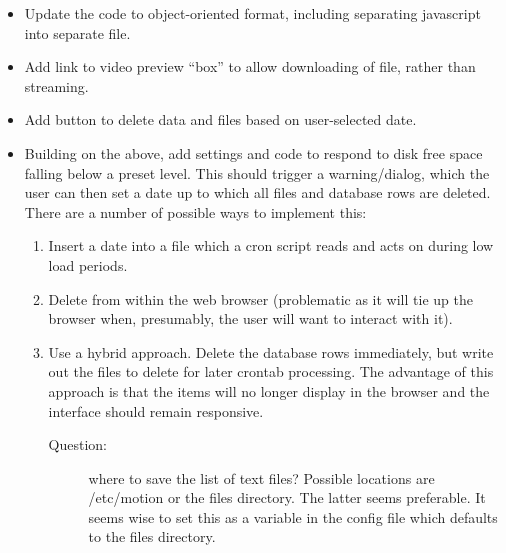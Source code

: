 \documentclass[12pt]{scrartcl} %
\begin{document}
	\begin{itemize}
		\item Update the code to object-oriented format, including separating javascript into separate file.
		
		\item Add link to video preview \enquote{box} to allow downloading of file, rather
		than streaming.
		
		\item Add button to delete data and files based on user-selected date.
		
		\item Building on the above, add settings and code to respond to disk free space falling below a preset level. 
		This should trigger a warning/dialog, which the user can then set a date up to which 
		all files and database rows are deleted. There are a number of possible ways to implement this:
		\begin{enumerate}
			\item Insert a date into a file which a cron script reads 
			and acts on during low load periods.
			\item Delete from within the web browser 
			(problematic as it will tie up the browser when, presumably, 
			the user will want to interact with it).
			\item Use a hybrid approach. Delete the database rows immediately, but write out the files to delete for later crontab processing. The advantage of this approach is that the items will no longer display in the browser and the interface should remain responsive.
			\begin{description}
				\item [Question:] where to save the list of text files? Possible locations are /etc/motion or the files directory. The latter seems preferable. It seems wise to set this as a variable in the config file which defaults to the files directory.
			\end{description}
		\end{enumerate}
		
	\end{itemize}
	
\end{document}
